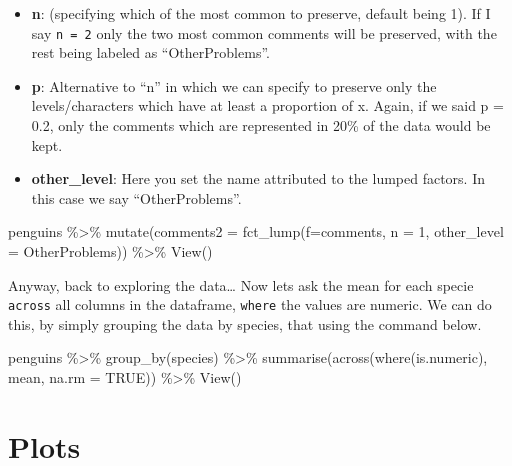 \documentclass[
]{book}
\newenvironment{Shaded}{\begin{snugshade}}{\end{snugshade}}
\newcommand{\AttributeTok}[1]{\textcolor[rgb]{0.77,0.63,0.00}{#1}}
\newcommand{\ConstantTok}[1]{\textcolor[rgb]{0.00,0.00,0.00}{#1}}
\newcommand{\DecValTok}[1]{\textcolor[rgb]{0.00,0.00,0.81}{#1}}
\newcommand{\FunctionTok}[1]{\textcolor[rgb]{0.00,0.00,0.00}{#1}}
\newcommand{\NormalTok}[1]{#1}
\newcommand{\SpecialCharTok}[1]{\textcolor[rgb]{0.00,0.00,0.00}{#1}}
\newcommand{\StringTok}[1]{\textcolor[rgb]{0.31,0.60,0.02}{#1}}
\begin{document}
\begin{itemize}
\item
  \textbf{n}: (specifying which of the most common to preserve, default being 1).
  If I say \texttt{n\ =\ 2} only the two most common comments will be preserved, with the rest being labeled as ``OtherProblems''.
\item
  \textbf{p}: Alternative to ``n'' in which we can specify to preserve only the levels/characters which have at least a proportion of x.
  Again, if we said p = 0.2, only the comments which are represented in 20\% of the data would be kept.
\item
  \textbf{other\_level}: Here you set the name attributed to the lumped factors.
  In this case we say ``OtherProblems''.
\end{itemize}

\begin{Shaded}
\begin{Highlighting}[]
\NormalTok{penguins }\SpecialCharTok{\%\textgreater{}\%} 
  \FunctionTok{mutate}\NormalTok{(}\AttributeTok{comments2 =} \FunctionTok{fct\_lump}\NormalTok{(}\AttributeTok{f=}\NormalTok{comments, }\AttributeTok{n =} \DecValTok{1}\NormalTok{, }\AttributeTok{other\_level =} \StringTok{\textquotesingle{}OtherProblems\textquotesingle{}}\NormalTok{)) }\SpecialCharTok{\%\textgreater{}\%} 
  \FunctionTok{View}\NormalTok{()}
\end{Highlighting}
\end{Shaded}

Anyway, back to exploring the data\ldots{}
Now lets ask the mean for each specie \texttt{across} all columns in the dataframe, \texttt{where} the values are numeric.
We can do this, by simply grouping the data by species, that using the command below.

\begin{Shaded}
\begin{Highlighting}[]
\NormalTok{penguins }\SpecialCharTok{\%\textgreater{}\%} 
  \FunctionTok{group\_by}\NormalTok{(species) }\SpecialCharTok{\%\textgreater{}\%} 
  \FunctionTok{summarise}\NormalTok{(}\FunctionTok{across}\NormalTok{(}\FunctionTok{where}\NormalTok{(is.numeric), mean, }\AttributeTok{na.rm =} \ConstantTok{TRUE}\NormalTok{)) }\SpecialCharTok{\%\textgreater{}\%} 
  \FunctionTok{View}\NormalTok{()}
\end{Highlighting}
\end{Shaded}

\hypertarget{plots}{%
\section{Plots}\label{plots}}
\end{document}
